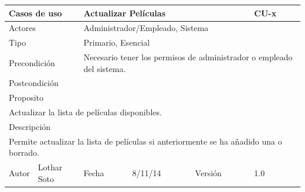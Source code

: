 \documentclass{article}
\begin{document}
\begin{table}[h]
\begin{tabular}{|l|l|l|l|l|l|}
\hline
\multicolumn{2}{|p{2cm}|}{Casos de uso}  & \multicolumn{3}{p{7cm}|}{\textbf{Actualizar Películas}} & CU-x \\
\hline
\multicolumn{2}{|p{2cm}|}{Actores}       & \multicolumn{4}{p{8cm}|}{Administrador/Empleado, Sistema}        \\
\hline
\multicolumn{2}{|p{2cm}|}{Tipo}          & \multicolumn{4}{p{8cm}|}{Primario, Esencial}        \\
\hline
\multicolumn{2}{|p{2cm}|}{Precondición}  & \multicolumn{4}{p{8cm}|}{Necesario tener los permisos de administrador o empleado del sistema.}        \\
\hline
\multicolumn{2}{|p{2cm}|}{Postcondición} & \multicolumn{4}{p{8cm}|}{}        \\
\hline
\multicolumn{6}{|p{10cm}|}{Proposito}                                   \\
\hline
\multicolumn{6}{|p{10cm}|}{Actualizar la lista de películas disponibles.}                                            \\
\hline
\multicolumn{6}{|p{10cm}|}{Descripción}                                 \\
\hline
\multicolumn{6}{|p{10cm}|}{Permite actualizar la lista de películas si anteriormente se ha añadido una o borrado.}                                            \\
\hline
Autor          &       Lothar Soto        & Fecha    &  8/11/14   &   Versión  & 1.0\\    
\hline
\end{tabular}
\end{table}
\end{document}
